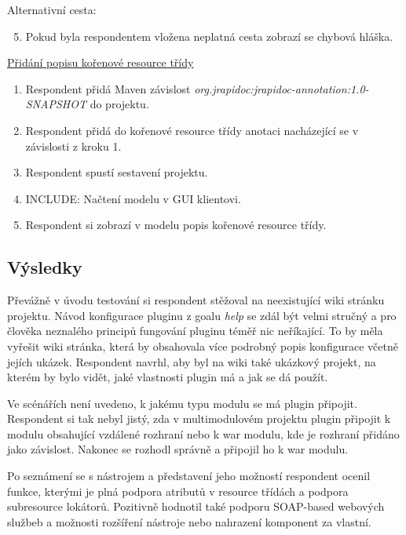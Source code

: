 \documentclass[11pt,twoside,a4paper]{book}
\begin{document}
Alternativní cesta:
\begin{enumerate}
  \setcounter{enumi}{4}
  \item Pokud byla respondentem vložena neplatná cesta zobrazí se chybová hláška.
\end{enumerate}

\underline{Přidání popisu kořenové resource třídy}

\begin{enumerate}
  \item Respondent přidá Maven závislost
  {\em org.jrapidoc:jrapidoc-annotation:1.0-SNAPSHOT} do projektu.
  \item Respondent přidá do kořenové resource třídy anotaci nacházející se v závislosti z
kroku 1.

  \item Respondent spustí sestavení projektu.
  \item INCLUDE: Načtení modelu v GUI klientovi.

  \item Respondent si zobrazí v modelu popis kořenové resource třídy.
\end{enumerate}

\subsection{Výsledky}

Převážně v úvodu testování si respondent stěžoval na neexistující wiki stránku
projektu.
Návod konfigurace pluginu z goalu {\em help} se zdál být velmi stručný a pro
člověka neznalého principů fungování pluginu téměř nic neříkající. To by měla
vyřešit wiki stránka, která by obsahovala více podrobný popis konfigurace včetně
jejích ukázek. Respondent navrhl, aby byl na wiki také ukázkový projekt, na
kterém by bylo vidět, jaké vlastnosti plugin má a jak se dá použít.

Ve scénářích není uvedeno, k jakému typu modulu se má plugin připojit.
Respondent si tak nebyl jistý, zda v multimodulovém projektu plugin připojit k
modulu obsahující vzdálené rozhraní nebo k war modulu, kde je rozhraní přidáno
jako závislost. Nakonec se rozhodl správně a připojil ho k war modulu.

Po seznámení se s nástrojem a představení jeho možností respondent ocenil
funkce, kterými je plná podpora atributů v resource třídách a podpora
subresource lokátorů. Pozitivně hodnotil také podporu SOAP-based webových
službeb a možnosti rozšíření nástroje nebo nahrazení komponent za vlastní.
\end{document}
